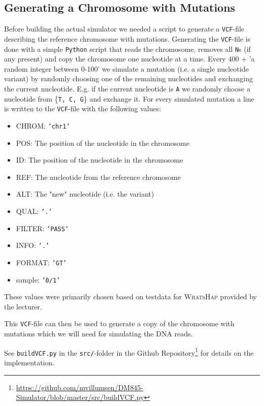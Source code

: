 \documentclass[10pt,a4paper]{article}
\begin{document}
\subsection{Generating a Chromosome with Mutations}
Before building the actual simulator we needed a script to generate a \texttt{VCF}-file describing the reference chromosome with mutations. Generating the \texttt{VCF}-file is done with a simple \texttt{Python} script that reads the chromosome, removes all \texttt{N}s (if any present) and copy the chromosome one nucleotide at a time. Every 400 + 'a random integer between 0-100' we simulate a mutation (i.e. a single nucleotide variant) by  randomly choosing one of the remaining nucleotides and exchanging the current nucleotide. E.g. if the current nucleotide is \texttt{A} we randomly choose a nucleotide from \{\texttt{T, C, G}\} and exchange it. For every simulated mutation a line is written to the \texttt{VCF}-file with the following values:
\begin{itemize}
\item CHROM: \texttt{'chr1'}
\item POS: The position of the nucleotide in the chromosome
\item ID: The position of the nucleotide in the chromosome
\item REF: The nucleotide from the reference chromosome
\item ALT: The "new" nucleotide (i.e. the variant)
\item QUAL: \texttt{'.'}
\item FILTER: \texttt{'PASS'}
\item INFO: \texttt{'.'}
\item FORMAT: \texttt{'GT'}
\item sample: \texttt{'0/1'}
\end{itemize}
These values were primarily chosen based on testdata for \textsc{WhatsHap} provided by the lecturer.

This \texttt{VCF}-file can then be used to generate a copy of the chromosome with mutations which we will need for simulating the DNA reads.

See \texttt{buildVCF.py} in the \texttt{src/}-folder in the Github Repository\footnote{\url{https://github.com/mvillumsen/DM845-Simulator/blob/master/src/buildVCF.py}} for details on the implementation.
\end{document}

